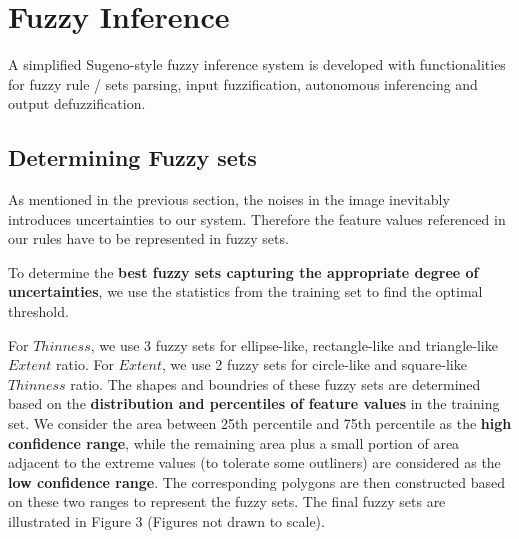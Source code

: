 \section{Fuzzy Inference}

A simplified Sugeno-style fuzzy inference system is developed with functionalities for fuzzy rule / sets parsing, input fuzzification, autonomous inferencing and output defuzzification.

\subsection{Determining Fuzzy sets}

As mentioned in the previous section, the noises in the image inevitably introduces uncertainties to our system. Therefore the feature values referenced in our rules have to be represented in fuzzy sets.

To determine the \textbf{best fuzzy sets capturing the appropriate degree of uncertainties}, we use the statistics from the training set to find the optimal threshold.

For $Thinness$, we use 3 fuzzy sets for ellipse-like, rectangle-like and triangle-like $Extent$ ratio. For $Extent$, we use 2 fuzzy sets for circle-like and square-like $Thinness$ ratio. The shapes and boundries of these fuzzy sets are determined based on the \textbf{distribution and percentiles of feature values} in the training set. We consider the area between 25th percentile and 75th percentile as the \textbf{high confidence range}, while the remaining area plus a small portion of area adjacent to the extreme values (to tolerate some outliners) are considered as the \textbf{low confidence range}. The corresponding polygons are then constructed based on these two ranges to represent the fuzzy sets. The final fuzzy sets are illustrated in Figure 3 (Figures not drawn to scale).

